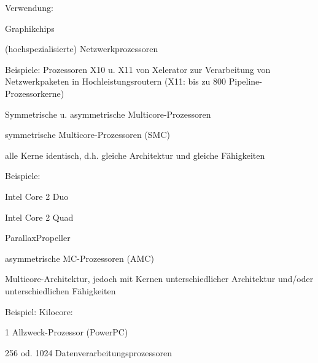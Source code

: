 \documentclass[a4paper]{article}
\begin{document}
\begin{multicols}{3}
\begin{itemize*}
\begin{itemize*}
            \item Verwendung: \begin{itemize*} \item Graphikchips \item (hochspezialisierte) Netzwerkprozessoren \end{itemize*}
            \item Beispiele: Prozessoren X10 u. X11 von Xelerator zur Verarbeitung von Netzwerkpaketen in Hochleistungsroutern (X11: bis zu 800 Pipeline-Prozessorkerne)
        \end{itemize*}
    \end{itemize*}

    Symmetrische u. asymmetrische Multicore-Prozessoren

    \begin{itemize*}
        \item symmetrische Multicore-Prozessoren (SMC)
        \begin{itemize*}
            \item alle Kerne identisch, d.h. gleiche Architektur und gleiche Fähigkeiten
            \item Beispiele: \begin{itemize*} \item Intel Core 2 Duo \item Intel Core 2 Quad \item ParallaxPropeller \end{itemize*}
        \end{itemize*}
        \item asymmetrische MC-Prozessoren (AMC)
        \item Multicore-Architektur, jedoch mit Kernen unterschiedlicher Architektur
        und/oder unterschiedlichen Fähigkeiten
        \item Beispiel: Kilocore:
        \begin{itemize*}
            \item 1 Allzweck-Prozessor (PowerPC)
            \item \begin{itemize*} \item 256 od. 1024 Datenverarbeitungsprozessoren \end{itemize*}
        \end{itemize*}
    \end{itemize*}



\end{multicols}
\end{document}
